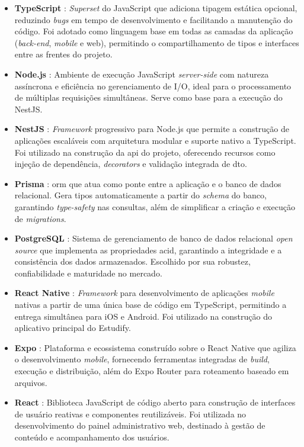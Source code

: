 \begin{itemize}
    \item \textbf{TypeScript} \parencite{typescript}: \textit{Superset} do JavaScript que adiciona tipagem estática opcional, reduzindo \textit{bugs} em tempo de desenvolvimento e facilitando a manutenção do código. Foi adotado como linguagem base em todas as camadas da aplicação (\textit{back-end}, \textit{mobile} e web), permitindo o compartilhamento de tipos e interfaces entre as frentes do projeto.
    \item \textbf{Node.js} \parencite{nodejs}: Ambiente de execução JavaScript \textit{server-side} com natureza assíncrona e eficiência no gerenciamento de I/O, ideal para o processamento de múltiplas requisições simultâneas. Serve como base para a execução do NestJS.
    \item \textbf{NestJS} \parencite{nestjs}: \textit{Framework} progressivo para Node.js que permite a construção de aplicações escaláveis com arquitetura modular e suporte nativo a TypeScript. Foi utilizado na construção da \ac{api} do projeto, oferecendo recursos como injeção de dependência, \textit{decorators} e validação integrada de \ac{dto}.
    \item \textbf{Prisma} \parencite{prisma}: \ac{orm} que atua como ponte entre a aplicação e o banco de dados relacional. Gera tipos automaticamente a partir do \textit{schema} do banco, garantindo \textit{type-safety} nas consultas, além de simplificar a criação e execução de \textit{migrations}.
    \item \textbf{PostgreSQL} \parencite{postgresql}: Sistema de gerenciamento de banco de dados relacional \textit{open source} que implementa as propriedades \ac{acid}, garantindo a integridade e a consistência dos dados armazenados. Escolhido por sua robustez, confiabilidade e maturidade no mercado.
    \item \textbf{React Native} \parencite{reactnative}: \textit{Framework} para desenvolvimento de aplicações \textit{mobile} nativas a partir de uma única base de código em TypeScript, permitindo a entrega simultânea para iOS e Android. Foi utilizado na construção do aplicativo principal do Estudify.
    \item \textbf{Expo} \parencite{expo}: Plataforma e ecossistema construído sobre o React Native que agiliza o desenvolvimento \textit{mobile}, fornecendo ferramentas integradas de \textit{build}, execução e distribuição, além do Expo Router para roteamento baseado em arquivos.
    \item \textbf{React} \parencite{react}: Biblioteca JavaScript de código aberto para construção de interfaces de usuário reativas e componentes reutilizáveis. Foi utilizada no desenvolvimento do painel administrativo web, destinado à gestão de conteúdo e acompanhamento dos usuários.
\end{itemize}

